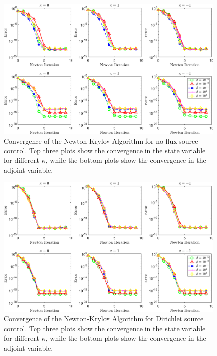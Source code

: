 \documentclass[11pt, a4paper]{article}
\theoremstyle{definition}
\begin{document}
\begin{figure}[h]
	\centering
	\includegraphics[scale=0.1]{SCNConvergence.png}
	\caption{Convergence of the Newton-Krylov Algorithm for no-flux source control. Top three plots show the convergence in the state variable for different $\kappa$, while the bottom plots show the convergence in the adjoint variable.} 
	\label{Con1}
\end{figure}
\begin{figure}[h]
	\centering
	\includegraphics[scale=0.1]{SCDConvergence.png}
	\caption{Convergence of the Newton-Krylov Algorithm for Dirichlet source control. Top three plots show the convergence in the state variable for different $\kappa$, while the bottom plots show the convergence in the adjoint variable.} 
	\label{Con2}
\end{figure}
\end{document}

